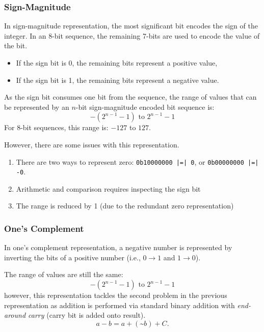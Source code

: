 \documentclass{article}
\begin{document}
\subsubsection{Sign-Magnitude}
In sign-magnitude representation, the most significant bit encodes the sign of the
integer. In an 8-bit sequence, the remaining 7-bits are used to
encode the value of the bit.
\begin{itemize}
    \item If the sign bit is 0, the remaining bits represent a positive value,
    \item If the sign bit is 1, the remaining bits represent a negative value.
\end{itemize}
As the sign bit consumes one bit from the sequence, the range of values that can be
represented by an \(n\)-bit sign-magnitude encoded bit sequence is:
\begin{equation*}
    -\left( 2^{n - 1} - 1 \right) \text{ to } 2^{n - 1} - 1
\end{equation*}
For 8-bit sequences, this range is: \(-127\) to \(127\).

However, there are some issues with this representation.
\begin{enumerate}
    \item There are two ways to represent zero: \texttt{0b10000000 |=| 0}, or \texttt{0b00000000 |=| -0}.
    \item Arithmetic and comparison requires inspecting the sign bit
    \item The range is reduced by 1 (due to the redundant zero representation)
\end{enumerate}
\subsubsection{One's Complement}
In one's complement representation, a negative number is represented by
inverting the bits of a positive number (i.e., \(0 \to 1\) and \(1 \to 0\)).

The range of values are still the same:
\begin{equation*}
    -\left( 2^{n - 1} - 1 \right) \text{ to } 2^{n - 1} - 1
\end{equation*}
however, this representation tackles the second problem in the previous representation as
addition is performed via standard binary addition with \textit{end-around carry} (carry bit is added onto result).
\begin{equation*}
    a - b = a + \left( \text{\textasciitilde} b \right) + C.
\end{equation*}
\end{document}

